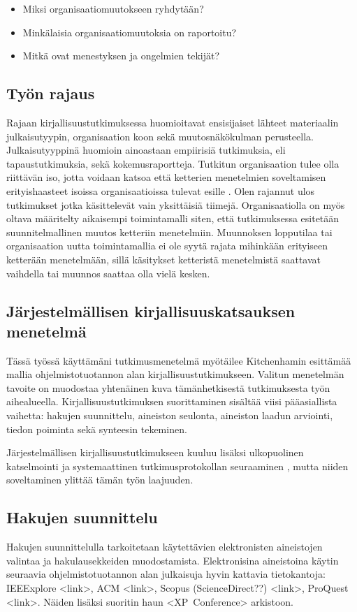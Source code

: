 \begin{itemize}
\item Miksi organisaatiomuutokseen ryhdytään?
\item Minkälaisia organisaatiomuutoksia on raportoitu?
\item Mitkä ovat menestyksen ja ongelmien tekijät?
\end{itemize}

\subsection{Työn rajaus}

Rajaan kirjallisuustutkimuksessa huomioitavat ensisijaiset lähteet materiaalin
julkaisutyypin, organisaation koon sekä muutosnäkökulman perusteella.
Julkaisutyyppinä huomioin ainoastaan empiirisiä tutkimuksia, eli
tapaustutkimuksia, sekä kokemusraportteja. Tutkitun organisaation tulee olla
riittävän iso, jotta voidaan katsoa että ketterien menetelmien soveltamisen
erityishaasteet isoissa organisaatioissa tulevat esille \citep{Lindvall2004}.
Olen rajannut ulos tutkimukset jotka käsittelevät vain yksittäisiä tiimejä.
Organisaatiolla on myös oltava määritelty aikaisempi toimintamalli siten, että
tutkimuksessa esitetään suunnitelmallinen muutos ketteriin menetelmiin.
Muunnoksen lopputilaa tai organisaation uutta toimintamallia ei ole syytä rajata
mihinkään erityiseen ketterään menetelmään, sillä käsitykset ketteristä
menetelmistä saattavat vaihdella tai muunnos saattaa olla vielä kesken.

\subsection{Järjestelmällisen kirjallisuuskatsauksen menetelmä}

Tässä työssä käyttämäni tutkimusmenetelmä myötäilee Kitchenhamin esittämää
mallia ohjelmistotuotannon alan kirjallisuustutkimukseen. Valitun menetelmän
tavoite on muodostaa yhtenäinen kuva tämänhetkisestä tutkimuksesta työn
aihealueella. Kirjallisuustutkimuksen suorittaminen sisältää viisi pääasiallista
vaihetta: hakujen suunnittelu, aineiston seulonta, aineiston laadun arviointi,
tiedon poiminta sekä synteesin tekeminen. \citep{Kitchenham2007}

Järjestelmällisen kirjallisuustutkimukseen kuuluu lisäksi ulkopuolinen
katselmointi ja systemaattinen tutkimusprotokollan seuraaminen
\citep{Kitchenham2007}, mutta niiden soveltaminen ylittää tämän työn laajuuden.

\subsection{Hakujen suunnittelu}
Hakujen suunnittelulla tarkoitetaan käytettävien elektronisten aineistojen
valintaa ja hakulausekkeiden muodostamista. Elektronisina aineistoina käytin
seuraavia ohjelmistotuotannon alan julkaisuja hyvin kattavia tietokantoja:
IEEExplore <link>, ACM <link>, Scopus (ScienceDirect??) <link>, ProQuest <link>.
Näiden lisäksi suoritin haun <XP~Conference> arkistoon.

